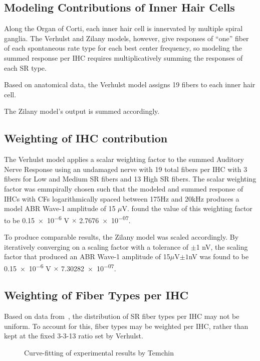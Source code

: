\subsection{Modeling Contributions of Inner Hair Cells} %
\label{sub:contributions_to_the_response_by_inner_hair_cells}
Along the Organ of Corti, each inner hair cell is innervated by multiple spiral ganglia.  The Verhulst and Zilany models, however, give responses of ``one'' fiber of each spontaneous rate type for each best center frequency, so modeling the summed response per IHC requires multiplicatively summing the responses of each SR type. 

Based on anatomical data, the Verhulst model assigns 19 fibers to each inner hair cell.  

The Zilany model's output is summed accordingly. 
\subsection{Weighting of IHC contribution} %
\label{sub:weighting_of_ihc_contribution}
The Verhulst model applies a scalar weighting factor to the summed Auditory Nerve Response using an undamaged nerve with 19 total fibers per IHC with 3 fibers for Low and Medium SR fibers and 13 High SR fibers. The scalar weighting factor was emmpirally chosen such that the modeled and summed response of IHCs with CFs logarithmically spaced between 175Hz and 20kHz produces a model ABR Wave-1 amplitude of 15 $\mu$V.  \citeauthor{Verhulst2015Functional} found the value of this weighting factor to be \num{0.15e-6} V $\times$ \num{2.7676e-07}.

To produce comparable results, the Zilany model was scaled accordingly. By iteratively converging on a scaling factor with a tolerance of $\pm$1 nV, the scaling factor that produced an ABR Wave-1 amplitude of 15$\mu$V$\pm 1$nV was found to be \num{0.15e-6} V $\times$ \num{7.30282e-07}.


\subsection{Weighting of Fiber Types per IHC} %
\label{sub:weighting_of_fiber_types_per_ihc}
Based on data from~\cite{Temchin2008Threshold}, the distribution of SR fiber types per IHC may not be uniform.  To account for this, fiber types may be weighted per IHC, rather than kept at the fixed 3-3-13 ratio set by Verhulst.  
\begin{figure}[htbp]
	\centering
	\caption{Curve-fitting of experimental results by Temchin}
	\label{fig:temchin-curvefit}
\end{figure}


